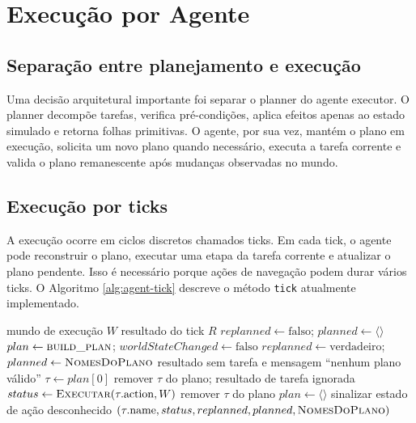 \chapter{Execução por Agente}

\section{Separação entre planejamento e execução}

Uma decisão arquitetural importante foi separar o planner do agente executor.
O planner decompõe tarefas, verifica pré-condições, aplica efeitos apenas ao
estado simulado e retorna folhas primitivas. O agente, por sua vez, mantém o
plano em execução, solicita um novo plano quando necessário, executa a tarefa
corrente e valida o plano remanescente após mudanças observadas no mundo.

\section{Execução por ticks}

A execução ocorre em ciclos discretos chamados ticks.
Em cada tick, o agente pode reconstruir o plano, executar uma etapa da tarefa
corrente e atualizar o plano pendente. Isso é necessário porque ações de
navegação podem durar vários ticks. O Algoritmo \ref{alg:agent-tick} descreve
o método \texttt{tick} atualmente implementado.

\begin{algorithm}[H]
\caption{Método \texttt{tick} do agente HTN}
\label{alg:agent-tick}
\begin{algorithmic}[1]
\Require mundo de execução $W$
\Ensure resultado do tick $R$
\State $replanned \gets \mathrm{falso}$; $planned \gets \langle\rangle$
  \State $plan \gets \Call{build\_plan}{}$; $worldStateChanged \gets \mathrm{falso}$
  \State $replanned \gets \mathrm{verdadeiro}$; $planned \gets \Call{NomesDoPlano}{}$
    \State \Return resultado sem tarefa e mensagem ``nenhum plano válido''
  \EndIf
\EndIf
\State $\tau \gets plan[0]$
  \State remover $\tau$ do plano; \Return resultado de tarefa ignorada
\EndIf
\State $status \gets \Call{Executar}{\tau.\mathrm{action},W}$
  \State remover $\tau$ do plano
  \State $plan \gets \langle\rangle$
  \State sinalizar estado de ação desconhecido
\EndIf
\State \Return $(\tau.\mathrm{name},status,replanned,planned,\Call{NomesDoPlano}{})$
\end{algorithmic}
\end{algorithm}

